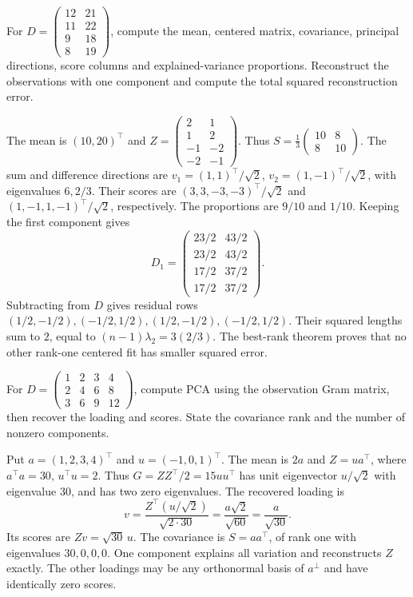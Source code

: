 \begin{problem}\label{ex:12:numerical-pca}
For $D=\begin{pmatrix}12&21\\11&22\\9&18\\8&19\end{pmatrix}$, compute
the mean, centered matrix, covariance, principal directions, score
columns and explained-variance proportions. Reconstruct the observations
with one component and compute the total squared reconstruction error.
\end{problem}
\begin{solution}
The mean is $(10,20)^\top$ and
$Z=\begin{pmatrix}2&1\\1&2\\-1&-2\\-2&-1\end{pmatrix}$.
Thus $S=\frac13\begin{pmatrix}10&8\\8&10\end{pmatrix}$.
The sum and difference directions are
$v_1=(1,1)^\top/\sqrt2$, $v_2=(1,-1)^\top/\sqrt2$, with eigenvalues
$6,2/3$. Their scores are $(3,3,-3,-3)^\top/\sqrt2$ and
$(1,-1,1,-1)^\top/\sqrt2$, respectively.
The proportions are $9/10$ and $1/10$.
Keeping the first component gives
\[
D_1=\begin{pmatrix}23/2&43/2\\23/2&43/2\\17/2&37/2\\17/2&37/2\end{pmatrix}.
\]
Subtracting from $D$ gives residual rows
$(1/2,-1/2),(-1/2,1/2),(1/2,-1/2),(-1/2,1/2)$.
Their squared lengths sum to $2$, equal to $(n-1)\lambda_2=3(2/3)$.
The best-rank theorem proves that no other rank-one centered fit has
smaller squared error.
\end{solution}

\begin{problem}
For $D=\begin{pmatrix}1&2&3&4\\2&4&6&8\\3&6&9&12\end{pmatrix}$,
compute PCA using the observation Gram matrix, then recover the loading
and scores. State the covariance rank and the number of nonzero components.
\end{problem}
\begin{solution}
Put $a=(1,2,3,4)^\top$ and $u=(-1,0,1)^\top$.
The mean is $2a$ and $Z=ua^\top$, where $a^\top a=30$, $u^\top u=2$.
Thus $G=ZZ^\top/2=15uu^\top$ has unit eigenvector $u/\sqrt2$ with
eigenvalue $30$, and has two zero eigenvalues.
The recovered loading is
\[
v=\frac{Z^\top(u/\sqrt2)}{\sqrt{2\cdot30}}
=\frac{a\sqrt2}{\sqrt{60}}=\frac a{\sqrt{30}}.
\]
Its scores are $Zv=\sqrt{30}\,u$.
The covariance is $S=aa^\top$, of rank one with eigenvalues $30,0,0,0$.
One component explains all variation and reconstructs $Z$ exactly.
The other loadings may be any orthonormal basis of $a^\perp$ and have
identically zero scores.
\end{solution}

